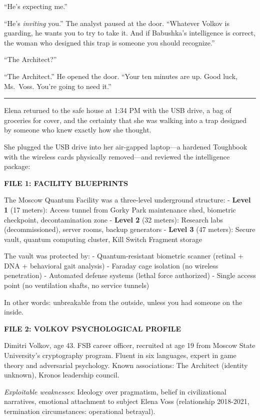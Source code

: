 ``He's expecting me.''

``He's \emph{inviting} you.'' The analyst paused at the door. ``Whatever Volkov is guarding, he wants you to try to take it. And if Babushka's intelligence is correct, the woman who designed this trap is someone you should recognize.''

``The Architect?''

``The Architect.'' He opened the door. ``Your ten minutes are up. Good luck, Ms.~Voss. You're going to need it.''

\begin{center}\rule{0.5\linewidth}{0.5pt}\end{center}

Elena returned to the safe house at 1:34 PM with the USB drive, a bag of groceries for cover, and the certainty that she was walking into a trap designed by someone who knew exactly how she thought.

She plugged the USB drive into her air-gapped laptop---a hardened Toughbook with the wireless cards physically removed---and reviewed the intelligence package:

\textbf{FILE 1: FACILITY BLUEPRINTS}

The Moscow Quantum Facility was a three-level underground structure: - \textbf{Level 1} (17 meters): Access tunnel from Gorky Park maintenance shed, biometric checkpoint, decontamination zone - \textbf{Level 2} (32 meters): Research labs (decommissioned), server rooms, backup generators - \textbf{Level 3} (47 meters): Secure vault, quantum computing cluster, Kill Switch Fragment storage

The vault was protected by: - Quantum-resistant biometric scanner (retinal + DNA + behavioral gait analysis) - Faraday cage isolation (no wireless penetration) - Automated defense systems (lethal force authorized) - Single access point (no ventilation shafts, no service tunnels)

In other words: unbreakable from the outside, unless you had someone on the inside.

\textbf{FILE 2: VOLKOV PSYCHOLOGICAL PROFILE}

Dimitri Volkov, age 43. FSB career officer, recruited at age 19 from Moscow State University's cryptography program. Fluent in six languages, expert in game theory and adversarial psychology. Known associations: The Architect (identity unknown), Kronos leadership council.

\emph{Exploitable weaknesses}: Ideology over pragmatism, belief in civilizational narratives, emotional attachment to subject Elena Voss (relationship 2018-2021, termination circumstances: operational betrayal).

